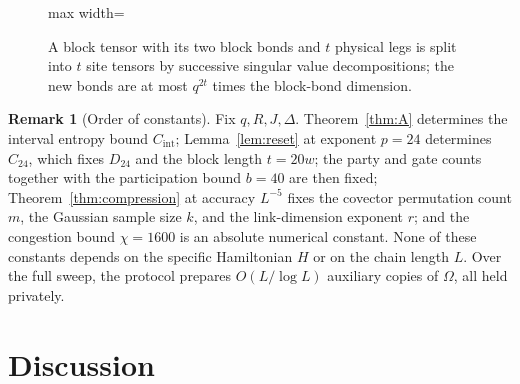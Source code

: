 \documentclass[aps,prx,reprint,superscriptaddress,floatfix,nofootinbib,longbibliography,amsmath,amssymb]{revtex4-2}
\newcommand{\Om}{\Omega}
\theoremstyle{plain}
\theoremstyle{definition}
\newtheorem{remark}[theorem]{Remark}
\begin{document}
\begin{figure}[t]
\centering
\begin{adjustbox}{max width=\linewidth}

\end{adjustbox}
\caption{A block tensor with its two block bonds and $t$ physical legs is split into $t$ site tensors by successive singular value decompositions; the new bonds are at most $q^{2t}$ times the block-bond dimension.}\label{fig:block-to-sites}
\end{figure}

\begin{remark}[Order of constants]
Fix $q,R,J,\Delta$. Theorem~\ref{thm:A} determines the interval entropy bound $C_{\mathrm{int}}$;
Lemma~\ref{lem:reset} at exponent $p=24$ determines $C_{24}$, which fixes $D_{24}$ and the
block length $t=20w$; the party and gate counts together with the participation bound
$b=40$ are then fixed; Theorem~\ref{thm:compression} at accuracy $L^{-5}$
fixes the covector permutation count $m$, the Gaussian sample size $k$, and
the link-dimension exponent $r$; and the congestion bound $\chi=1600$ is an absolute numerical constant.
None of these constants depends on the specific Hamiltonian $H$ or on the chain length $L$. Over the full sweep, the protocol prepares
$O(L/\log L)$ auxiliary copies of $\Om$, all held privately.
\end{remark}

\section{Discussion}\label{sec:discussion}
\end{document}

